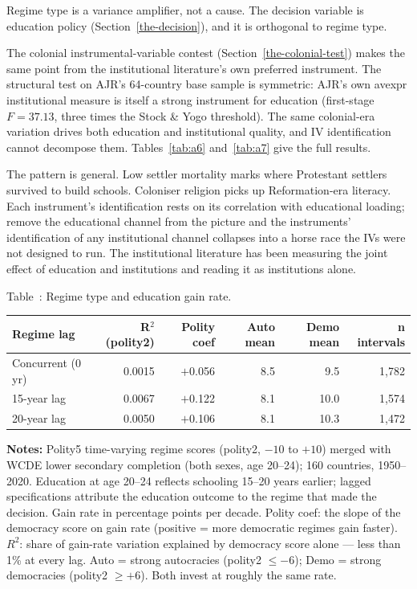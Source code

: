 \documentclass[12pt,letterpaper]{article}
\begin{document}
{Regime type is a variance amplifier, not a cause. The decision variable is education policy (Section~\ref{the-decision}), and it is orthogonal to regime type.

The colonial instrumental-variable contest (Section~\ref{the-colonial-test}) makes the same point from the institutional literature's own preferred instrument. The structural test on AJR's 64-country base sample is symmetric: AJR's own avexpr institutional measure is itself a strong instrument for education (first-stage $F=37.13$, three times the Stock \& Yogo threshold). The same colonial-era variation drives both education and institutional quality, and IV identification cannot decompose them. Tables~\ref{tab:a6} and~\ref{tab:a7} give the full results.

The pattern is general. Low settler mortality marks where Protestant settlers survived to build schools. Coloniser religion picks up Reformation-era literacy. Each instrument's identification rests on its correlation with educational loading; remove the educational channel from the picture and the instruments' identification of any institutional channel collapses into a horse race the IVs were not designed to run. The institutional literature has been measuring the joint effect of education and institutions and reading it as institutions alone.

\label{tab:a5}Table~\thetable: Regime type and education gain rate.

{\small
\begin{longtable}[]{@{}lrrrrr@{}}
\toprule
Regime lag & R$^2$(polity2) & Polity coef & Auto mean & Demo mean & n intervals \\
\midrule
\endhead
Concurrent (0 yr) & 0.0015 & $+$0.056 & 8.5 & 9.5 & 1,782 \\
15-year lag & 0.0067 & $+$0.122 & 8.1 & 10.0 & 1,574 \\
20-year lag & 0.0050 & $+$0.106 & 8.1 & 10.3 & 1,472 \\
\bottomrule
\end{longtable}
}

\begin{minipage}{\dimexpr\textwidth-2em}
\scriptsize
\textbf{Notes:} Polity5 time-varying regime scores (polity2, $-10$
to $+10$) merged with WCDE lower secondary completion (both sexes,
age 20--24); 160 countries, 1950--2020. Education at age 20--24
reflects schooling 15--20 years earlier; lagged specifications
attribute the education outcome to the regime that made the
decision. Gain rate in percentage points per decade. Polity coef:
the slope of the democracy score on gain rate (positive = more
democratic regimes gain faster). $R^2$: share of gain-rate variation
explained by democracy score alone --- less than 1\% at every lag.
Auto = strong autocracies (polity2 $\leq -6$); Demo = strong
democracies (polity2 $\geq +6$). Both invest at roughly the same
rate.
\end{minipage}

}
\end{document}
